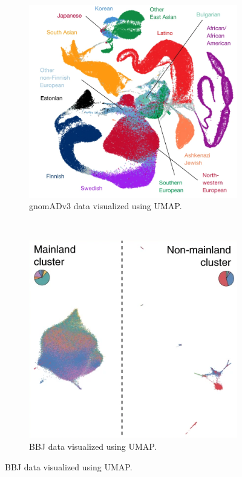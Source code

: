 \documentclass[12pt]{article}
\newcommand{\rulesep}{\unskip\ \vrule\ }
\begin{document}
\begin{figure}[h!]
  \centering
  \begin{subfigure}[b]{0.49\linewidth}
    \includegraphics[width=\linewidth]{external_images/gnomAD_umap.png}
    \caption{gnomADv3 data visualized using UMAP.}
    \label{fig:gnomAD_UMAP}
  \end{subfigure}
  \rulesep
  \begin{subfigure}[b]{0.49\linewidth}
    \includegraphics[width=\linewidth]{external_images/BBJ_UMAP.png}
    \caption{BBJ data visualized using UMAP.}
    \label{fig:BBJ_UMAP}
  \end{subfigure}


\end{figure}
\end{document}
